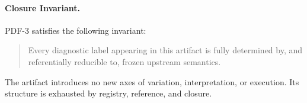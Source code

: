 \paragraph{Closure Invariant.}
PDF-3 satisfies the following invariant:

\begin{quote}
Every diagnostic label appearing in this artifact is fully determined by,
and referentially reducible to, frozen upstream semantics.
\end{quote}

The artifact introduces no new axes of variation, interpretation, or execution.
Its structure is exhausted by registry, reference, and closure.
